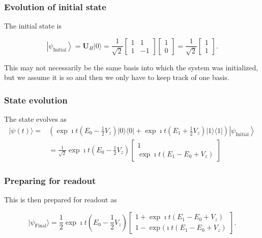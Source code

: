 \documentclass{beamer}
\begin{document}
\begin{frame}
\frametitle{Evolution of initial state}

The initial state is 

\[
\left|\psi_{\mathrm{Initial}}\right\rangle=\bm{U}_{H}|0\rangle=\frac{1}{\sqrt{2}}\left[\begin{array}{cc}
1 & 1 \\
1 & -1
\end{array}\right]\begin{bmatrix} 1 \\ 0\end{bmatrix}=\frac{1}{\sqrt{2}}\begin{bmatrix} 1 \\ 1\end{bmatrix}.
\]

This may not necessarily be the same basis into which the system was
initialized, but we  assume it is so and then we only have to keep track
of one basis.
\end{frame}

\begin{frame}
\frametitle{State evolution}

The state evolves as
\begin{align*}
|\psi(t)\rangle=&\left(\exp{\imath t\left(E_{0}-\frac{1}{2}  V_z\right)}|0\rangle\langle 0|+\exp{\imath t\left(E_{1}+\frac{1}{2}  V_z\right)}|1\rangle\langle 1|\right)\left|\psi_{\mathrm{Initial}}\right\rangle\\
&=\frac{1}{\sqrt{2}} \exp{\imath t\left(E_{0}-\frac{1}{2}  V_z\right)}\begin{bmatrix}1 \\ \exp{\imath t\left(E_{1}-E_{0}+ V_z\right)}\end{bmatrix}
\end{align*}
\end{frame}

\begin{frame}
\frametitle{Preparing for readout}

This is then prepared for readout as

\[
\vert\psi_{\mathrm{Final}}\rangle=\frac{1}{2} \exp{\imath t(E_{0}-\frac{1}{2}  V_z)}
\begin{bmatrix} 1+\exp{\imath t(E_{1}-E_{0}+ V_z)} \\ 1-\exp{(\imath t(E_{1}-E_{0}+ V_z)}\end{bmatrix}.
\]
\end{frame}
\end{document}
